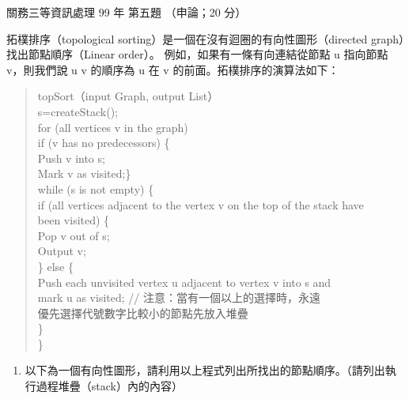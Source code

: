 \begin{pastexam}[label={px:gw3-099-ds-04}]{關務三等資訊處理 99 年 第五題}
（申論；20 分）

拓樸排序（topological sorting）是一個在沒有迴圈的有向性圖形（directed graph）找出節點順序（Linear order）。
例如，如果有一條有向連結從節點 u 指向節點 v，則我們說 u v 的順序為 u 在 v 的前面。拓樸排序的演算法如下：
\begin{quote}
topSort（input Graph, output List）\\
\hspace*{1em}s=createStack();\\
\hspace*{1em}for (all vertices v in the graph)\\
\hspace*{3em}if (v has no predecessors) \{\\
\hspace*{4em}Push v into s;\\
\hspace*{4em}Mark v as visited;\}\\
\hspace*{1em}while (s is not empty) \{\\
\hspace*{3em}if (all vertices adjacent to the vertex v on the top of the stack have\\
\hspace*{5em}been visited) \{\\
\hspace*{7em}Pop v out of s;\\
\hspace*{7em}Output v;\\
\hspace*{3em}\} else \{\\
\hspace*{7em}Push each unvisited vertex u adjacent to vertex v into s and\\
\hspace*{7em}mark u as visited; // 注意：當有一個以上的選擇時，永遠\\
\hspace*{7em}優先選擇代號數字比較小的節點先放入堆疊\\
\hspace*{4em}\}\\
\hspace*{1em}\}
\end{quote}
\begin{enumerate}[leftmargin=2.2em]
\item[㈠] 以下為一個有向性圖形，請利用以上程式列出所找出的節點順序。（請列出執行過程堆疊（stack）內的內容）

\end{enumerate}
\end{pastexam}
